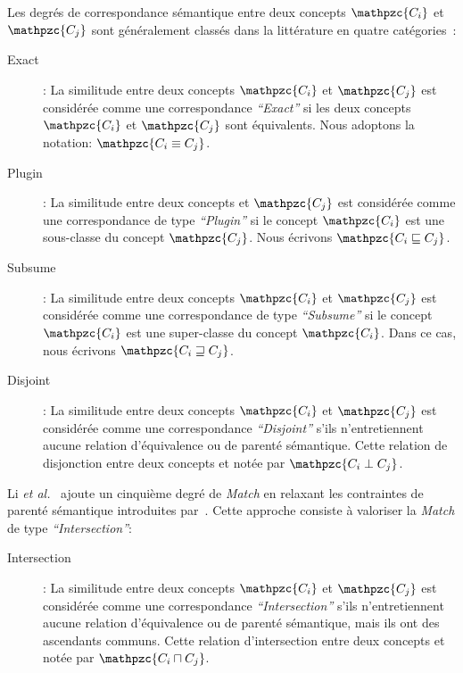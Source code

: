 
Les degrés de correspondance sémantique entre deux concepts
$\mathpzc{C_i}$ et $\mathpzc{C_j}$ sont généralement classés dans la
littérature en quatre catégories~\cite{paolucci2002semantic}:\medskip

\begin{description}
\item[Exact]: La similitude entre deux concepts $\mathpzc{C_i}$ et
  $\mathpzc{C_j}$ est considérée comme une correspondance
  \emph{``Exact''} si les deux concepts $\mathpzc{C_i}$ et
  $\mathpzc{C_j}$ sont équivalents. Nous adoptons la notation: {\large
    $\mathpzc{C_i \equiv C_j}$}.\medskip

\item[Plugin]: La similitude entre deux concepts et $\mathpzc{C_j}$
  est considérée comme une correspondance de type \emph{``Plugin''} si
  le concept $\mathpzc{C_i}$ est une sous-classe du concept
  $\mathpzc{C_j}$. Nous écrivons {\large
    $\mathpzc{C_i \sqsubseteq C_j}$}.\medskip

\item[Subsume]: La similitude entre deux concepts $\mathpzc{C_i}$ et
  $\mathpzc{C_j}$ est considérée comme une correspondance de type
  \emph{``Subsume''} si le concept $\mathpzc{C_i}$ est une
  super-classe du concept $\mathpzc{C_i}$. Dans ce cas, nous écrivons
  {\large $\mathpzc{C_i \sqsupseteq C_j}$}.\medskip

\item[Disjoint]: La similitude entre deux concepts $\mathpzc{C_i}$ et
  $\mathpzc{C_j}$ est considérée comme une correspondance
  \emph{``Disjoint''} s'ils n'entretiennent aucune relation
  d'équivalence ou de parenté sémantique. Cette relation de
  disjonction entre deux concepts et notée par {\large
    $\mathpzc{C_i \perp C_j}$}.\medskip
\end{description}


Li \emph{et al.}~\cite{li2004software} ajoute un cinquième degré de
\emph{Match} en relaxant les contraintes de parenté sémantique
introduites par~\cite{paolucci2002semantic}. Cette approche consiste à
valoriser la \emph{Match} de type \emph{``Intersection''}:

\begin{description}
\item[Intersection]: La similitude entre deux concepts $\mathpzc{C_i}$
  et $\mathpzc{C_j}$ est considérée comme une correspondance
  \emph{``Intersection''} s'ils n'entretiennent aucune relation
  d'équivalence ou de parenté sémantique, mais ils ont des ascendants
  communs. Cette relation d'intersection entre deux concepts et notée
  par {\large $\mathpzc{C_i \sqcap C_j}$}.\medskip
\end{description}

